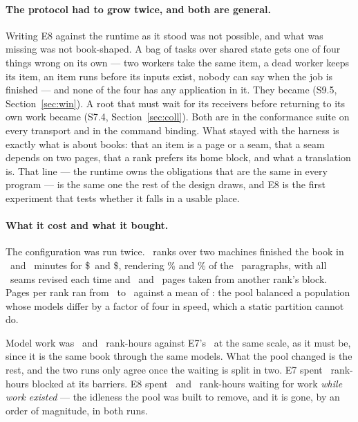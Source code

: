\paragraph{The protocol had to grow twice, and both are general.} Writing E8
against the runtime as it stood was not possible, and what was missing was not
book-shaped. A bag of tasks over shared state gets one of four things wrong on
its own --- two workers take the same item, a dead worker keeps its item, an
item runs before its inputs exist, nobody can say when the job is finished ---
and none of the four has any application in it. They became 
(S9.5, Section~\ref{sec:win}). A root that must wait for its receivers before
returning to its own work became  (S7.4, Section~\ref{sec:coll}).
Both are in the conformance suite on every transport and in the command binding.
What stayed with the harness is exactly what is about books: that an item is a
page or a seam, that a seam depends on two pages, that a rank prefers its home
block, and what a translation is. That line --- the runtime owns the obligations
that are the same in every program --- is the same one the rest of the design
draws, and E8 is the first experiment that tests whether it falls in a usable
place.

\paragraph{What it cost and what it bought.} The configuration was run twice.
\eEightRanks\ ranks over two machines finished the book in \eEightWall\ and
\eEightBWall\ minutes for \$\eEightCost\ and \$\eEightBCost, rendering
\eEightCoverage\% and \eEightBCoverage\% of the \eEightParagraphs\ paragraphs,
with all \eEightSeams\ seams revised each time and \eEightStolen\ and
\eEightBStolen\ pages taken from another rank's block. Pages per rank ran from
\eEightPagesMin\ to \eEightPagesMax\ against a mean of \eEightPagesMean: the pool
balanced a population whose models differ by a factor of four in speed, which a
static partition cannot do.

Model work was \eEightModelH\ and \eEightBModelH\ rank-hours against E7's
\eSevenWorkHSixteen\ at the same scale, as it must be, since it is the same book
through the same models. What the pool changed is the rest, and the two runs only
agree once the waiting is split in two. E7 spent \eSevenBlockedHSixteen\
rank-hours blocked at its barriers. E8 spent \eEightWaitWorkH\ and
\eEightBWaitWorkH\ rank-hours waiting for work \emph{while work existed} --- the
idleness the pool was built to remove, and it is gone, by an order of magnitude,
in both runs.

